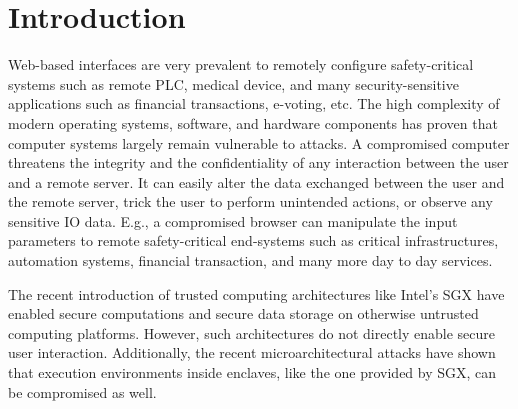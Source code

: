 \section{Introduction}
\label{sec:intro}

Web-based interfaces are very prevalent to remotely configure safety-critical systems such as remote PLC, medical device, and many security-sensitive applications such as financial transactions, e-voting, etc. The high complexity of modern operating systems, software, and hardware components has proven that computer systems largely remain vulnerable to attacks. A compromised computer threatens the integrity and the confidentiality of any interaction between the user and a remote server. It can
easily alter the data exchanged between the user and the remote server, trick the user to perform unintended actions, or observe any sensitive IO data. E.g., a compromised browser can manipulate the input parameters to remote safety-critical end-systems such as critical infrastructures, automation systems, financial transaction, and many more day to day services.


The recent introduction of trusted computing architectures like Intel's SGX have enabled secure computations and secure data storage on otherwise untrusted computing platforms. However, such architectures do not directly enable secure user interaction. Additionally, the recent microarchitectural attacks have shown that execution environments inside enclaves, like the one provided by SGX, can be compromised as well.

\iffalse
\begin{figure}[t]
\centering
\texttt{[image: motivation.pdf]}
\caption{\textbf{Motivating examples.} 1) Pointer based UI elements that sets parameters to remote safety-critical device, 2) E-voting where the voting privacy and integrity is critical, 3) Financial transactions such as bitcoin wallet that shows sensitive information such as the user's private key and 4) web applications that provide an option for the user to reveal credentials.}
\spacesave
\label{fig:motivation}
\centering
\end{figure}
\fi


